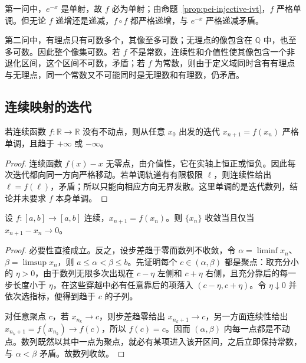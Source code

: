 \begin{solve}
第一问中，$e^{-x}$ 是单射，故 $f$ 必为单射；由命题~\ref{prop:pei-injective-ivt}，$f$ 严格单调。但无论 $f$ 递增还是递减，$f\circ f$ 都严格递增，与 $e^{-x}$ 严格递减矛盾。

第二问中，有理点只有可数多个，其像至多可数；无理点的像包含在 $\mathbb Q$ 中，也至多可数。因此整个像集可数。若 $f$ 不是常数，连续性和介值性使其像包含一个非退化区间，这个区间不可数，矛盾；若 $f$ 为常数，则由于定义域同时含有有理点与无理点，同一个常数又不可能同时是无理数和有理数，仍矛盾。
\end{solve}

\subsection{连续映射的迭代}

\begin{proposition}
若连续函数 $f:\mathbb R\to\mathbb R$ 没有不动点，则从任意 $x_0$ 出发的迭代 $x_{n+1}=f(x_n)$ 严格单调，且趋于 $+\infty$ 或 $-\infty$。
\end{proposition}

\begin{proof}
连续函数 $f(x)-x$ 无零点，由介值性，它在实轴上恒正或恒负。因此每次迭代都向同一方向严格移动。若单调轨道有有限极限 $\ell$，则连续性给出 $\ell=f(\ell)$，矛盾；所以只能向相应方向无界发散。这里单调的是迭代数列，结论并未要求 $f$ 本身单调。
\end{proof}

\begin{theorem}
\label{thm:pei-iteration-small-step}
设 $f:[a,b]\to[a,b]$ 连续，$x_{n+1}=f(x_n)$。则 $\{x_n\}$ 收敛当且仅当 $x_{n+1}-x_n\to0$。
\end{theorem}

\begin{proof}
必要性直接成立。反之，设步差趋于零而数列不收敛，令 $\alpha=\liminf x_n$、$\beta=\limsup x_n$，则 $a\le\alpha<\beta\le b$。先证明每个 $c\in(\alpha,\beta)$ 都是聚点：取充分小的 $\eta>0$，由于数列无限多次出现在 $c-\eta$ 左侧和 $c+\eta$ 右侧，且充分靠后的每一步长度小于 $\eta$，在这些穿越中必有任意靠后的项落入 $(c-\eta,c+\eta)$。令 $\eta\downarrow0$ 并依次选指标，便得到趋于 $c$ 的子列。

对任意聚点 $c$，若 $x_{n_k}\to c$，则步差趋零给出 $x_{n_k+1}\to c$，另一方面连续性给出 $x_{n_k+1}=f(x_{n_k})\to f(c)$，所以 $f(c)=c$。因而 $(\alpha,\beta)$ 内每一点都是不动点。数列既然以其中一点为聚点，就必有某项进入该开区间，之后立即保持常数，与 $\alpha<\beta$ 矛盾。故数列收敛。
\end{proof}

